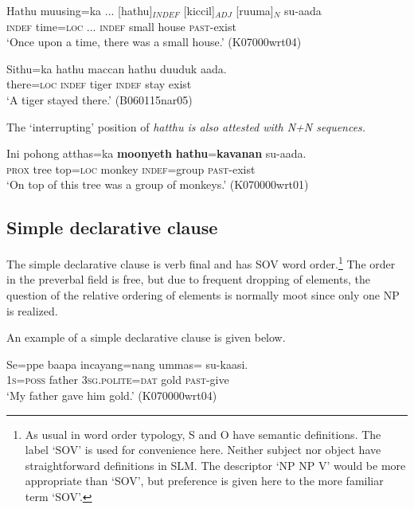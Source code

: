 \ea\label{ex:positionhatthu:hatthuadjn}
\gll Hathu muusing=ka ...  [hathu]$_{INDEF}$  [kiccil]$_{ADJ}$ [ruuma]$_{N}$ su-aada \\
     \textsc{indef} time=\textsc{loc} ... \textsc{indef} small house \textsc{past}-exist  \\
    `Once upon a time, there was a small house.'  (K07000wrt04)
\z

\ea\label{ex:positionhatthu:hatthunhatthu}
\gll Sithu=ka hathu maccan hathu  duuduk aada. \\
     there=\textsc{loc} \textsc{indef} tiger \textsc{indef} stay exist  \\
    `A tiger stayed there.'  (B060115nar05)
\z

The `interrupting' position of \em hatthu \em is also attested with N+N sequences.

\ea
\gll Ini pohong atthas=ka \textbf{moonyeth} \textbf{hathu}=\textbf{kavanan} su-aada. \\
     \textsc{prox} tree top=\textsc{loc}  monkey \textsc{indef}=group \textsc{past}-exist\\
    `On top of this tree was a group of monkeys.'   (K070000wrt01)
\z


\subsection{Simple declarative clause}
The simple declarative clause is verb final and has SOV word order.\footnote{As
 usual in word order typology, S and O have semantic definitions.  The label `SOV' is used for convenience here. Neither subject nor object have straightforward definitions in SLM. The descriptor `NP NP V' would be more appropriate than `SOV', but  preference is given here to the more familiar term `SOV'.} The order in the preverbal field is free, but due to frequent dropping of elements, the question of the relative ordering of elements is normally moot since only one NP is realized. 

An example of a simple declarative clause is given below.

% 



\ea\label{ex:semrole:pat:theme:zero}
\gll Se=ppe    baapa  incayang=nang    ummas=\zero{} su-kaasi. \\ %
      \textsc{1s=poss} father 3\textsc{sg}.\textsc{polite}=\textsc{dat} gold \textsc{past}-give\\
    `My father gave him gold.'  (K070000wrt04)
\z

